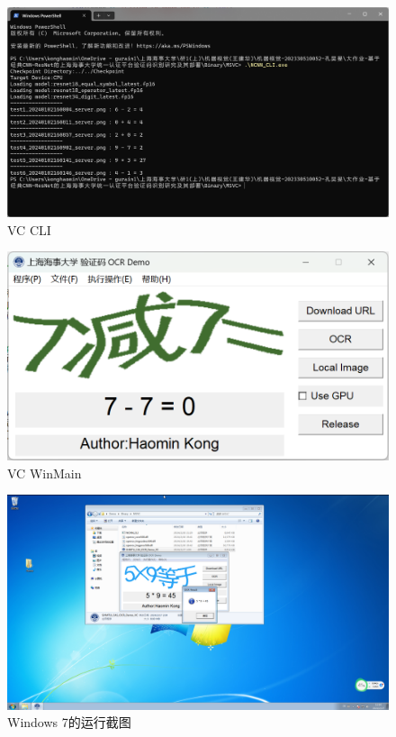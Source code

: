 \begin{figure}
	\centering
	\includegraphics[width=0.9\linewidth]{Resources/Picture/vc_cli}
	\caption{VC CLI}
	\label{fig:vccli}
\end{figure}

\begin{figure}
	\centering
	\includegraphics[width=0.9\linewidth]{Resources/Picture/vc_main}
	\caption{VC WinMain}
	\label{fig:vcmain}
\end{figure}

\begin{figure}
	\centering
	\includegraphics[width=0.9\linewidth]{Resources/Picture/msvc-win7}
	\caption{Windows 7的运行截图}
	\label{fig:msvc-win7}
\end{figure}
